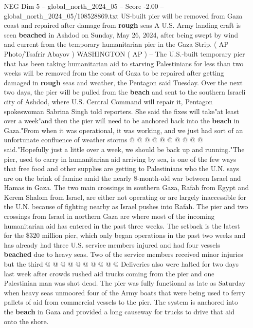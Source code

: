\begin{textsample}{NEG Dim 5 – global\_north\_2024\_05 – Score -2.00 – global\_north\_2024\_05/108528869.txt}  \label{ex:f5_neg_283}
US-built pier will be removed from Gaza coast and repaired after damage from \textbf{rough} seas A U.S.
Army landing craft is seen \textbf{beached} in Ashdod on Sunday, May 26, 2024, after being swept by wind and current from the temporary humanitarian pier in the Gaza Strip. ( AP Photo/Tsafrir Abayov ) WASHINGTON ( AP ) -- The U.S.-built temporary pier that has been taking humanitarian aid to starving Palestinians for less than two weeks will be removed from the coast of Gaza to be repaired after getting damaged in \textbf{rough} seas and weather, the Pentagon said Tuesday.
Over the next two days, the pier will be pulled from the \textbf{beach} and sent to the southern Israeli city of Ashdod, where U.S.
Central Command will repair it, Pentagon spokeswoman Sabrina Singh told reporters.
She said the fixes will take"at least over a week"and then the pier will need to be anchored back into the \textbf{beach} in Gaza."From when it was operational, it was working, and we just had sort of an unfortunate confluence of weather storms @ @ @ @ @ @ @ @ @ @ said."Hopefully just a little over a week, we should be back up and running."The pier, used to carry in humanitarian aid arriving by sea, is one of the few ways that free food and other supplies are getting to Palestinians who the U.N. says are on the brink of famine amid the nearly 8-month-old war between Israel and Hamas in Gaza.
The two main crossings in southern Gaza, Rafah from Egypt and Kerem Shalom from Israel, are either not operating or are largely inaccessible for the U.N. because of fighting nearby as Israel pushes into Rafah.
The pier and two crossings from Israel in northern Gaza are where most of the incoming humanitarian aid has entered in the past three weeks.
The setback is the latest for the \$320 million pier, which only began operations in the past two weeks and has already had three U.S. service members injured and had four vessels \textbf{beached} due to heavy seas.
Two of the service members received minor injuries but the third @ @ @ @ @ @ @ @ @ @ Deliveries also were halted for two days last week after crowds rushed aid trucks coming from the pier and one Palestinian man was shot dead.
The pier was fully functional as late as Saturday when heavy seas unmoored four of the Army boats that were being used to ferry pallets of aid from commercial vessels to the pier.
The system is anchored into the \textbf{beach} in Gaza and provided a long causeway for trucks to drive that aid onto the shore.

\end{textsample}
